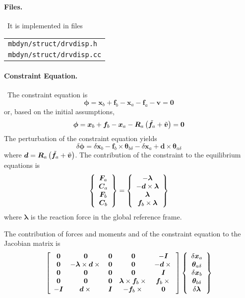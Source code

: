 \documentclass[10pt,fleqn,subeqn]{report}
\newcommand{\T}[1]{\bm{#1}}
\begin{document}
\paragraph{Files.} \
It is implemented in files

\begin{tabular}{l}
\texttt{mbdyn/struct/drvdisp.h} \\
\texttt{mbdyn/struct/drvdisp.cc}
\end{tabular}

\paragraph{Constraint Equation.} \
The constraint equation is
\begin{equation}
	\T{\phi} = \T{x}_b + \T{f}_b - \T{x}_a - \T{f}_a - \T{v} = \T{0}
\end{equation}
or, based on the initial assumptions,
\begin{equation}
	\T{\phi} = \T{x}_b + \T{f}_b - \T{x}_a
		- \T{R}_a\plbr{\tilde{\T{f}}_a + \tilde{\T{v}}} = \T{0}
\end{equation}
The perturbation of the constraint equation yields
\begin{equation}
	\delta\T{\phi} = 
		\delta\T{x}_b
		- \T{f}_b\times\T{\theta}_{b\delta}
		- \delta\T{x}_a
		+ \T{d}\times\T{\theta}_{a\delta}
\end{equation}
where $\T{d}=\T{R}_a\plbr{\tilde{\T{f}}_a + \tilde{\T{v}}}$.
The contribution of the constraint to the equilibrium equations is
\begin{equation}
	\cubr{\cvvect{
		\T{F}_a \\
		\T{C}_a \\
		\T{F}_b \\
		\T{C}_b
	}} = \cubr{\cvvect{
		- \T{\lambda} \\
		- \T{d}\times\T{\lambda} \\
		\T{\lambda} \\
		\T{f}_b\times\T{\lambda}
	}}
\end{equation}
where $\T{\lambda}$ is the reaction force in the global reference frame.

The contribution of forces and moments and of the constraint equation 
to the Jacobian matrix is
\begin{equation}
	\sqbr{\matr{ccccc}{
		\T{0} & \T{0} & \T{0} & \T{0} & - \T{I} \\
		\T{0} & - \T{\lambda}\times\T{d}\times{} & \T{0} & \T{0} & - \T{d}\times{}\\
		\T{0} & \T{0} & \T{0} & \T{0} & \T{I} \\
		\T{0} & \T{0} & \T{0} & \T{\lambda}\times\T{f}_b\times{} & \T{f}_b\times{} \\
		- \T{I} & \T{d}\times{} & \T{I} & - \T{f}_b\times{} & \T{0}
	}}\cubr{\cvvect{
		\delta\T{x}_a \\
		\T{\theta}_{a\delta} \\
		\delta\T{x}_b \\
		\T{\theta}_{b\delta} \\
		\delta\T{\lambda}
	}}
\end{equation}
\end{document}

